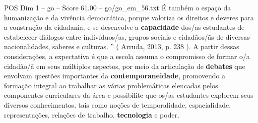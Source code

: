 \begin{textsample}{POS Dim 1 – go – Score 61.00 – go/go\_em\_56.txt}
É também o espaço da humanização e da vivência democrática, porque valoriza os direitos e deveres para a construção da cidadania, e se desenvolve a \textbf{capacidade} dos/as estudantes de estabelecer diálogos entre indivíduos/as, grupos sociais e cidadãos/ãs de diversas nacionalidades, saberes e culturas. ” ( Arruda, 2013, p. 238 ).
A partir dessas considerações, a expectativa é que a escola assuma o compromisso de formar o/a cidadão/ã em seus múltiplos aspectos, por meio da articulação de \textbf{debates} que envolvam questões importantes da \textbf{contemporaneidade}, promovendo a formação integral ao trabalhar as várias problemáticas elencadas pelos componentes curriculares da área e possibilite que os/as estudantes explorem seus diversos conhecimentos, tais como noções de temporalidade, espacialidade, representações, relações de trabalho, \textbf{tecnologia} e poder.

\end{textsample}
